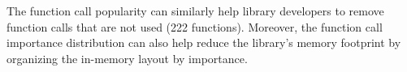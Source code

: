 

The \libc{} function call popularity can similarly help library developers to remove function calls that
are not used (222 functions). 
Moreover, the function call importance distribution can also help reduce the library's memory footprint by
organizing the in-memory layout by importance.

